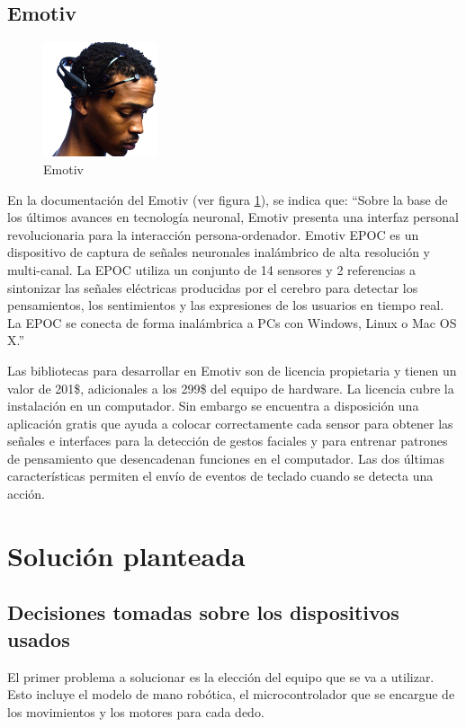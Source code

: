 \documentclass[letterpaper,journal,transmag]{IEEEtran}
\begin{document}
\subsection{Emotiv}
\label{subsec:emotiv}
      \begin{figure}[ht]
         \includegraphics[width=0.3\textwidth]{emotiv}
         \caption{Emotiv}
         \label{fig:emotiv}
      \end{figure}
En la documentación del Emotiv (ver figura \ref{fig:emotiv}),
se indica que: ``Sobre la base de los últimos avances en tecnología neuronal,
Emotiv presenta una interfaz personal revolucionaria para la interacción 
persona-ordenador. Emotiv EPOC es un dispositivo de captura de señales
neuronales inalámbrico de alta resolución y multi-canal. La EPOC utiliza un
conjunto de 14 sensores y 2 referencias a sintonizar las señales eléctricas
producidas por el cerebro para detectar los pensamientos, los sentimientos y las
expresiones de los usuarios en tiempo real. La EPOC se conecta de forma
inalámbrica a PCs con Windows, Linux o Mac OS X.''

Las bibliotecas para desarrollar en Emotiv son de licencia propietaria y tienen
un valor de 201\$, adicionales a los 299\$ del equipo de hardware. La licencia
cubre la instalación en un computador. Sin embargo se encuentra a disposición
una aplicación gratis que ayuda a colocar correctamente cada sensor para
obtener las señales e interfaces para la detección de gestos faciales y para
entrenar patrones de pensamiento que desencadenan funciones en el computador.
Las dos últimas características permiten el envío de eventos de teclado cuando
se detecta una acción.

\section{Solución planteada}
\subsection{Decisiones tomadas sobre los dispositivos usados}
\label{subsec:decisiones}
El primer problema a solucionar es la elección del equipo que se va a utilizar.
Esto incluye el modelo de mano robótica, el microcontrolador que se encargue de
los movimientos y los motores para cada dedo.
\end{document}
